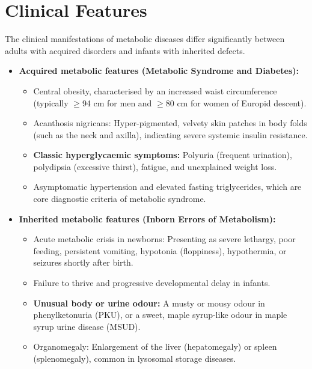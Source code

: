 \section*{Clinical Features}
The clinical manifestations of metabolic diseases differ significantly between adults with acquired disorders and infants with inherited defects.
\begin{itemize}
    \item \textbf{Acquired metabolic features (Metabolic Syndrome and Diabetes):}
        \begin{itemize}
            \item Central obesity, characterised by an increased waist circumference (typically $\ge$94 cm for men and $\ge$80 cm for women of Europid descent).
            \item Acanthosis nigricans: Hyper-pigmented, velvety skin patches in body folds (such as the neck and axilla), indicating severe systemic insulin resistance.
            \item \textbf{Classic hyperglycaemic symptoms:} Polyuria (frequent urination), polydipsia (excessive thirst), fatigue, and unexplained weight loss.
            \item Asymptomatic hypertension and elevated fasting triglycerides, which are core diagnostic criteria of metabolic syndrome.
        \end{itemize}
    \item \textbf{Inherited metabolic features (Inborn Errors of Metabolism):}
        \begin{itemize}
            \item Acute metabolic crisis in newborns: Presenting as severe lethargy, poor feeding, persistent vomiting, hypotonia (floppiness), hypothermia, or seizures shortly after birth.
            \item Failure to thrive and progressive developmental delay in infants.
            \item \textbf{Unusual body or urine odour:} A musty or mousy odour in phenylketonuria (PKU), or a sweet, maple syrup-like odour in maple syrup urine disease (MSUD).
            \item Organomegaly: Enlargement of the liver (hepatomegaly) or spleen (splenomegaly), common in lysosomal storage diseases.
        \end{itemize}
\end{itemize}

